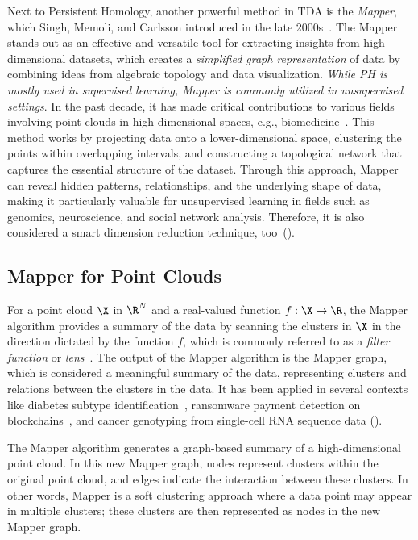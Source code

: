 
Next to Persistent Homology, another powerful method in TDA is the \textit{Mapper}, which Singh, Memoli, and Carlsson introduced in the late 2000s~\cite{singh2007topological, Carlsson:2009}.  The Mapper stands out as an effective and versatile tool for extracting insights from high-dimensional datasets, which creates a \textit{simplified graph representation} of data by combining ideas from algebraic topology and data visualization. \textit{While PH is mostly used in supervised learning, Mapper is commonly utilized in unsupervised settings}. In the past decade, it has made critical contributions to various fields involving point clouds in high dimensional spaces, e.g., biomedicine~\cite{skaf2022topological}. This method works by projecting data onto a lower-dimensional space, clustering the points within overlapping intervals, and constructing a topological network that captures the essential structure of the dataset. Through this approach, Mapper can reveal hidden patterns, relationships, and the underlying shape of data, making it particularly valuable for unsupervised learning in fields such as genomics, neuroscience, and social network analysis. Therefore, it is also considered a smart dimension reduction technique, too~().

 
\subsection{Mapper for Point Clouds} \label{sec:mapper-PC}
For a point cloud $\X$ in $\R^N$ and a real-valued function $f: \X \to \R$, the Mapper algorithm provides a summary of the data by scanning the clusters in $\X$ in the direction dictated by the function $f$, which is commonly referred to as a \textit{filter function} or \textit{lens}~\cite{dey2022computational}. The output of the Mapper algorithm is the Mapper graph, which is considered a meaningful summary of the data, representing clusters and relations between the clusters in the data. It has been applied in several contexts like diabetes subtype identification~\cite{li2015identification}, ransomware payment detection on blockchains~\cite{bitcoinheist2020}, and cancer genotyping from single-cell RNA sequence data ().

The Mapper algorithm generates a graph-based summary of a high-dimensional point cloud. In this new Mapper graph, nodes represent clusters within the {original} point cloud, and edges indicate the interaction between these clusters. In other words, Mapper is a soft clustering approach where a data point may appear in multiple clusters; these clusters are then represented as nodes in the new Mapper graph.

